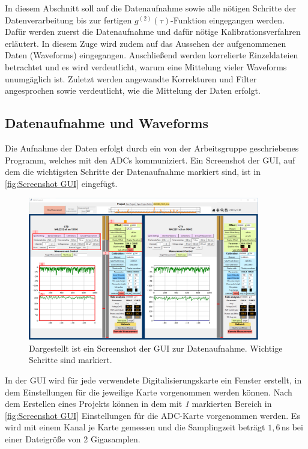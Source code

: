 In diesem Abschnitt soll auf die Datenaufnahme sowie alle nötigen Schritte der Datenverarbeitung bis zur fertigen $g^{(2)}(\tau)$-Funktion eingegangen werden. 
Dafür werden zuerst die Datenaufnahme und dafür nötige Kalibrationsverfahren erläutert. 
In diesem Zuge wird zudem auf das Aussehen der aufgenommenen Daten (Waveforms) eingegangen. 
Anschließend werden korrelierte Einzeldateien betrachtet und es wird verdeutlicht, warum eine Mittelung vieler Waveforms unumgäglich ist. 
Zuletzt werden angewandte Korrekturen und Filter angesprochen sowie verdeutlicht, wie die Mittelung der Daten erfolgt. 

\subsection{Datenaufnahme und Waveforms}
\label{ssec:Datenaufnahme und Waveforms}
Die Aufnahme der Daten erfolgt durch ein von der Arbeitsgruppe geschriebenes Programm, welches mit den ADCs kommuniziert. Ein Screenshot der GUI, auf dem die wichtigsten Schritte der Datenaufnahme markiert sind, ist in \autoref{fig:Screenshot GUI} eingefügt. 
\begin{figure}[h]
    \centering
    \includegraphics[width=0.9\textwidth]{images/Datenaufnahme/GUI.pdf}
    \caption{Dargestellt ist ein Screenshot der GUI zur Datenaufnahme. Wichtige Schritte sind markiert.}
    \label{fig:Screenshot GUI}
\end{figure}
In der GUI wird für jede verwendete Digitalisierungskarte ein Fenster erstellt, in dem Einstellungen für die jeweilige Karte vorgenommen werden können. 
Nach dem Erstellen eines Projekts können in dem mit \emph{1} markierten Bereich in \autoref{fig:Screenshot GUI} Einstellungen für die ADC-Karte vorgenommen werden. 
Es wird mit einem Kanal je Karte gemessen und die Samplingzeit beträgt $1{,}6$\,ns bei einer Dateigröße von 2 Gigasamplen. 
